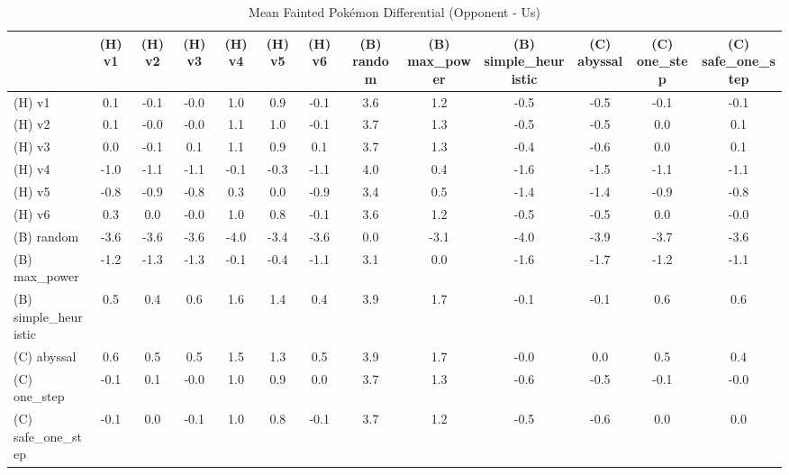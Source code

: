\begin{table}[htbp]
\caption{Mean Fainted Pokémon Differential (Opponent - Us)}
\label{tab:fainted_diff}
\begin{tabular}{lcccccccccccc}
\hline
 & (H) v1 & (H) v2 & (H) v3 & (H) v4 & (H) v5 & (H) v6 & (B) random & (B) max\_power & (B) simple\_heuristic & (C) abyssal & (C) one\_step & (C) safe\_one\_step \\
\hline
(H) v1 & 0.1 & -0.1 & -0.0 & 1.0 & 0.9 & -0.1 & 3.6 & 1.2 & -0.5 & -0.5 & -0.1 & -0.1 \\
(H) v2 & 0.1 & -0.0 & -0.0 & 1.1 & 1.0 & -0.1 & 3.7 & 1.3 & -0.5 & -0.5 & 0.0 & 0.1 \\
(H) v3 & 0.0 & -0.1 & 0.1 & 1.1 & 0.9 & 0.1 & 3.7 & 1.3 & -0.4 & -0.6 & 0.0 & 0.1 \\
(H) v4 & -1.0 & -1.1 & -1.1 & -0.1 & -0.3 & -1.1 & 4.0 & 0.4 & -1.6 & -1.5 & -1.1 & -1.1 \\
(H) v5 & -0.8 & -0.9 & -0.8 & 0.3 & 0.0 & -0.9 & 3.4 & 0.5 & -1.4 & -1.4 & -0.9 & -0.8 \\
(H) v6 & 0.3 & 0.0 & -0.0 & 1.0 & 0.8 & -0.1 & 3.6 & 1.2 & -0.5 & -0.5 & 0.0 & -0.0 \\
(B) random & -3.6 & -3.6 & -3.6 & -4.0 & -3.4 & -3.6 & 0.0 & -3.1 & -4.0 & -3.9 & -3.7 & -3.6 \\
(B) max\_power & -1.2 & -1.3 & -1.3 & -0.1 & -0.4 & -1.1 & 3.1 & 0.0 & -1.6 & -1.7 & -1.2 & -1.1 \\
(B) simple\_heuristic & 0.5 & 0.4 & 0.6 & 1.6 & 1.4 & 0.4 & 3.9 & 1.7 & -0.1 & -0.1 & 0.6 & 0.6 \\
(C) abyssal & 0.6 & 0.5 & 0.5 & 1.5 & 1.3 & 0.5 & 3.9 & 1.7 & -0.0 & 0.0 & 0.5 & 0.4 \\
(C) one\_step & -0.1 & 0.1 & -0.0 & 1.0 & 0.9 & 0.0 & 3.7 & 1.3 & -0.6 & -0.5 & -0.1 & -0.0 \\
(C) safe\_one\_step & -0.1 & 0.0 & -0.1 & 1.0 & 0.8 & -0.1 & 3.7 & 1.2 & -0.5 & -0.6 & 0.0 & 0.0 \\
\hline
\end{tabular}
\end{table}
